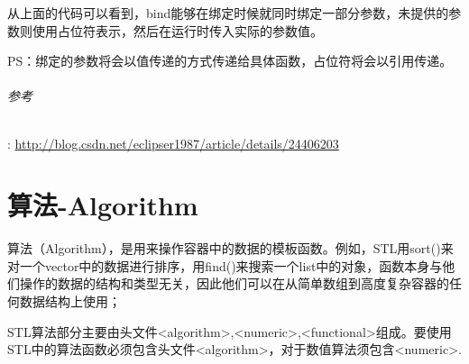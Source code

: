 \documentclass[UTF8,a4paper,12pt]{ctexbook}
\begin{document}
		从上面的代码可以看到，bind能够在绑定时候就同时绑定一部分参数，未提供的参数则使用占位符表示，然后在运行时传入实际的参数值。
		
		PS：绑定的参数将会以值传递的方式传递给具体函数，占位符将会以引用传递。
		
		\subparagraph{参考}:
			\url{http://blog.csdn.net/eclipser1987/article/details/24406203}

\chapter{算法-Algorithm}
	算法（Algorithm），是用来操作容器中的数据的模板函数。例如，STL用sort()来对一个vector中的数据进行排序，用find()来搜索一个list中的对象，函数本身与他们操作的数据的结构和类型无关，因此他们可以在从简单数组到高度复杂容器的任何数据结构上使用；
	
	STL算法部分主要由头文件<algorithm>,<numeric>,<functional>组成。要使用STL中的算法函数必须包含头文件<algorithm>，对于数值算法须包含<numeric>.
\end{document}
